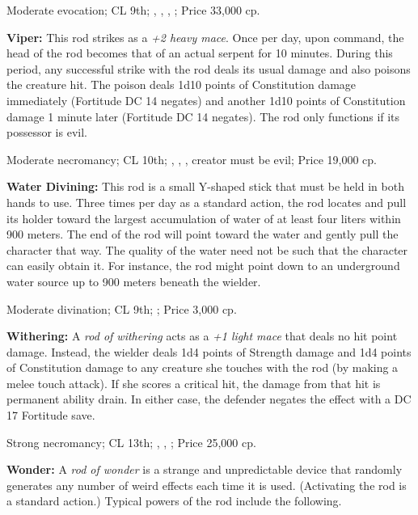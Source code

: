 Moderate evocation; CL 9th; , , , ; Price 33,000 cp.

\textbf{Viper:} This rod strikes as a \emph{+2 heavy mace}. Once per day, upon command, the head of the rod becomes that of an actual serpent for 10 minutes. During this period, any successful strike with the rod deals its usual damage and also poisons the creature hit. The poison deals 1d10 points of Constitution damage immediately (Fortitude DC 14 negates) and another 1d10 points of Constitution damage 1 minute later (Fortitude DC 14 negates). The rod only functions if its possessor is evil.

Moderate necromancy; CL 10th; , , , creator must be evil; Price 19,000 cp.

\textbf{Water Divining:} This rod is a small Y-shaped stick that must be held in both hands to use. Three times per day as a standard action, the rod locates and pull its holder toward the largest accumulation of water of at least four liters within 900 meters. The end of the rod will point toward the water and gently pull the character that way. The quality of the water need not be such that the character can easily obtain it. For instance, the rod might point down to an underground water source up to 900 meters beneath the wielder.

Moderate divination; CL 9th; ; Price 3,000 cp.

\textbf{Withering:} A \emph{rod of withering} acts as a \emph{+1 light mace} that deals no hit point damage. Instead, the wielder deals 1d4 points of Strength damage and 1d4 points of Constitution damage to any creature she touches with the rod (by making a melee touch attack). If she scores a critical hit, the damage from that hit is permanent ability drain. In either case, the defender negates the effect with a DC 17 Fortitude save.

Strong necromancy; CL 13th; , , ; Price 25,000 cp.

\textbf{Wonder:} A \emph{rod of wonder} is a strange and unpredictable device that randomly generates any number of weird effects each time it is used. (Activating the rod is a standard action.) Typical powers of the rod include the following.

